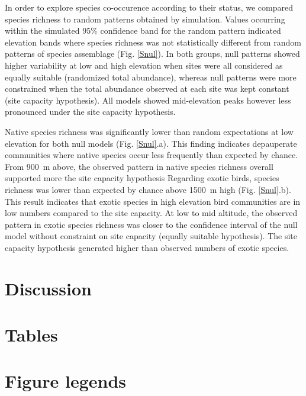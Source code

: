 \documentclass{article}
\begin{document}
In order to explore species co-occurence according to their status, we compared species richness to random patterns obtained by simulation. Values occurring within the simulated 95\% confidence band for the random pattern indicated elevation bands where species richness was not statistically different from random patterns of species assemblage (Fig. \ref{Snul}). In both groups, null patterns showed higher variability at low and high elevation when sites were all considered as equally suitable (randomized total abundance), whereas null patterns were more constrained when the total abundance observed at each site was kept constant (site capacity hypothesis). All models showed mid-elevation peaks however less pronounced under the site capacity hypothesis.

Native species richness was significantly lower than random expectations at low elevation for both null models (Fig. \ref{Snul}.a). This finding indicates depauperate communities where native species occur less frequently than expected by chance.  From 900~m above, the observed pattern in native species richness overall supported more the site capacity hypothesis Regarding exotic birds, species richness was lower than expected by chance above 1500~m high (Fig. \ref{Snul}.b). This result indicates that exotic species in high elevation bird communities are in low numbers compared to the site capacity. At low to mid altitude, the observed pattern in exotic species richness was closer to the confidence interval of the null model without constraint on site capacity (equally suitable hypothesis). The site capacity hypothesis generated higher than observed numbers of exotic species. 


\section{Discussion}

\section{Tables}



\section{Figure legends}
\end{document}
